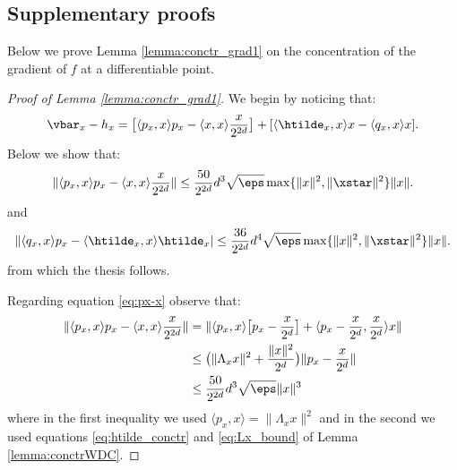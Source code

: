 \subsection{Supplementary proofs}\label{sec:supp_proof}


Below we prove Lemma \ref{lemma:conctr_grad1} on the concentration of the gradient of $f$ at a differentiable point. 
\begin{proof}[Proof of Lemma \ref{lemma:conctr_grad1}]
	We begin by noticing that:
		\[\vbar_x - h_x = \big[\langle p_x, x \rangle p_x - \langle x, x\rangle \frac{x}{2^{2d}} \big] + [ \langle \htilde_x , x \rangle x -  \langle q_x , x \rangle x ].\]
		Below we show  that:
		\begin{equation}\label{eq:px-x}
		\| \langle p_x, x \rangle p_x - \langle x, x\rangle \frac{x}{2^{2d}}\| \leq \frac{50}{2^{2d}} d^3 \sqrt{\eps} \max\{\|x\|^2, \|\xstar\|^2\} \|x\|.
		\end{equation}
		and
		\begin{equation}\label{eq:qx-htx}
		\| \langle q_x, x \rangle p_x - \langle \htilde_x, x\rangle \htilde_x| \leq \frac{36}{2^{2d}} d^4 \sqrt{\eps} \max\{\|x\|^2, \|\xstar\|^2\} \|x\|.
		\end{equation}
		from which the thesis follows.
		
		
		Regarding equation \eqref{eq:px-x} observe that:
		\[
			\begin{aligned}
				\| \langle p_x, x \rangle p_x - \langle x, x\rangle \frac{x}{2^{2d}}\| &= \| \langle p_x ,x \rangle  \big[ p_x - \frac{x}{2^d} \big] +  \langle p_x - \frac{x}{2^d} , \frac{x}{2^d} \rangle x \| \\				
				&\leq  \big( \|\Lambda_x x\|^2 + \frac{\|x\|^2}{2^{d}} \big) \|p_x - \frac{x}{2^d}\| \\
				& \leq \frac{50}{2^{2d}} d^3 \sqrt{\eps} \|x\|^3
			\end{aligned}
		\]
		where in the first inequality we used $\langle p_x, x\rangle = \|\Lambda_x x\|^2$ and in the second we used equations \eqref{eq:htilde_conctr} and \eqref{eq:Lx_bound} of Lemma \ref{lemma:conctrWDC}.
		

\end{proof}

